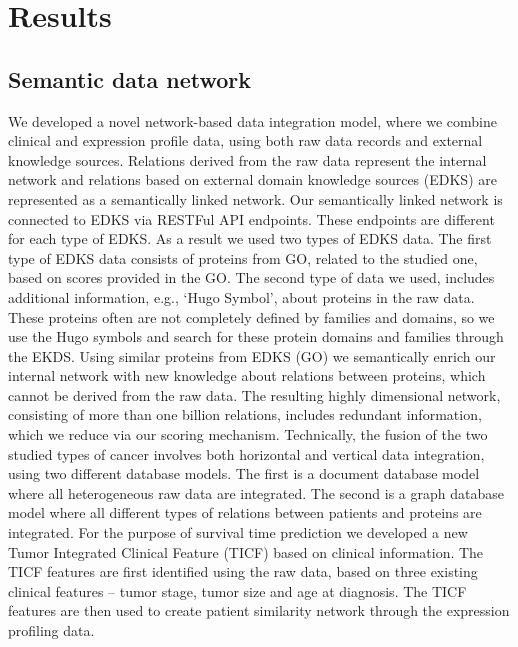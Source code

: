 \documentclass{bmcart}
\begin{document}
\section{Results}

\subsection{Semantic data network}

We developed a novel network-based data integration model, where we
combine clinical and expression profile data, using both raw data
records and external knowledge sources. Relations derived from the raw
data represent the internal network and relations based on external
domain knowledge sources (EDKS) are represented as a semantically
linked network. Our semantically linked network is connected to EDKS
via RESTFul API endpoints. These endpoints are different for each type
of EDKS. As a result we used two types of EDKS data. The first type of
EDKS data consists of proteins from GO, related to the studied one,
based on scores provided in the GO. The second type of data we used,
includes additional information, e.g., {\textquoteleft}Hugo
Symbol{\textquoteright}, about proteins in the raw data. These proteins
often are not completely defined by families and domains, so we use the
Hugo symbols and search for these protein domains and families through
the EKDS. Using similar proteins from EDKS (GO) we semantically enrich
our internal network with new knowledge about relations between
proteins, which cannot be derived from the raw data. The resulting
highly dimensional network, consisting of more than one billion
relations, includes redundant information, which we reduce via our
scoring mechanism. Technically, the fusion of the two studied types of
cancer involves both horizontal and vertical data integration, using
two different database models. The first is a document database model
where all heterogeneous raw data are integrated. The second is a graph
database model where all different types of relations between patients
and proteins are integrated. For the purpose of survival time
prediction we developed a new Tumor Integrated Clinical Feature (TICF)
based on clinical information. The TICF features are first identified
using the raw data, based on three existing clinical features -- tumor
stage, tumor size and age at diagnosis. The TICF features are then used
to create patient similarity network through the expression profiling
data. 
\end{document}
